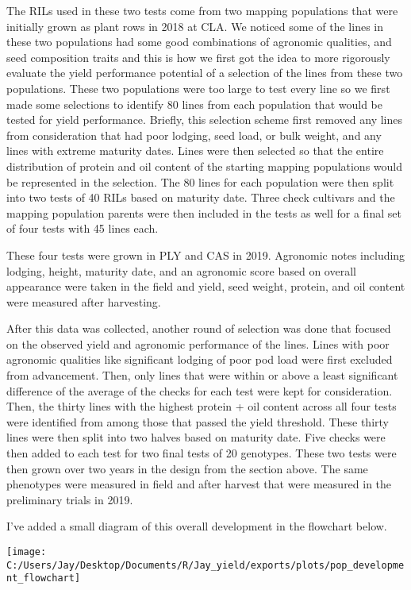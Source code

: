 \documentclass[
]{article}
\begin{document}
The RILs used in these two tests come from two mapping populations that
were initially grown as plant rows in 2018 at CLA. We noticed some of
the lines in these two populations had some good combinations of
agronomic qualities, and seed composition traits and this is how we
first got the idea to more rigorously evaluate the yield performance
potential of a selection of the lines from these two populations. These
two populations were too large to test every line so we first made some
selections to identify 80 lines from each population that would be
tested for yield performance. Briefly, this selection scheme first
removed any lines from consideration that had poor lodging, seed load,
or bulk weight, and any lines with extreme maturity dates. Lines were
then selected so that the entire distribution of protein and oil content
of the starting mapping populations would be represented in the
selection. The 80 lines for each population were then split into two
tests of 40 RILs based on maturity date. Three check cultivars and the
mapping population parents were then included in the tests as well for a
final set of four tests with 45 lines each.

These four tests were grown in PLY and CAS in 2019. Agronomic notes
including lodging, height, maturity date, and an agronomic score based
on overall appearance were taken in the field and yield, seed weight,
protein, and oil content were measured after harvesting.

After this data was collected, another round of selection was done that
focused on the observed yield and agronomic performance of the lines.
Lines with poor agronomic qualities like significant lodging of poor pod
load were first excluded from advancement. Then, only lines that were
within or above a least significant difference of the average of the
checks for each test were kept for consideration. Then, the thirty lines
with the highest protein + oil content across all four tests were
identified from among those that passed the yield threshold. These
thirty lines were then split into two halves based on maturity date.
Five checks were then added to each test for two final tests of 20
genotypes. These two tests were then grown over two years in the design
from the section above. The same phenotypes were measured in field and
after harvest that were measured in the preliminary trials in 2019.

I've added a small diagram of this overall development in the flowchart
below.

\begin{center}\texttt{[image: C:/Users/Jay/Desktop/Documents/R/Jay\_yield/exports/plots/pop\_development\_flowchart]} \end{center}
\end{document}
